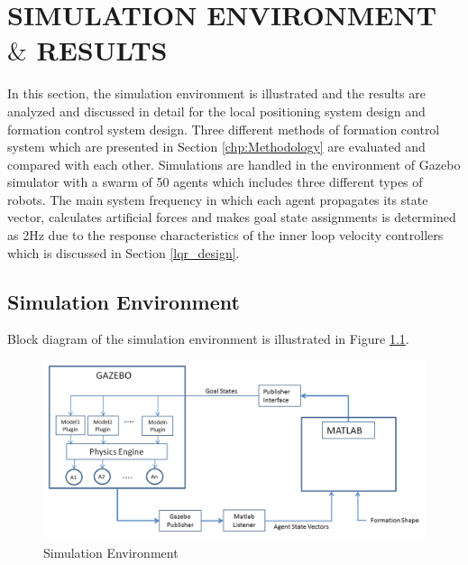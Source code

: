 

\chapter{SIMULATION ENVIRONMENT $\&$ RESULTS}
\label{chp:simulation}













In this section, the simulation environment is illustrated and the results are analyzed and discussed in detail for the local positioning system design and formation control system design. Three different methods of formation control system which are presented in Section \ref{chp:Methodology} are evaluated and compared with each other. Simulations are handled in the environment of Gazebo simulator with a swarm of 50 agents which includes three different types of robots. The main system frequency in which each agent propagates its state vector, calculates artificial forces and makes goal state assignments is determined as 2Hz due to the response characteristics of the inner loop velocity controllers which is discussed in Section \ref{lqr_design}. 

\section{Simulation Environment}
Block diagram of the simulation environment is illustrated in Figure \ref{simulation_env_ref}.

\begin{figure}[H]
\caption{Simulation Environment} \label{simulation_env_ref}
\centering
\includegraphics[scale = 0.45]{environment}
\end{figure}
    
